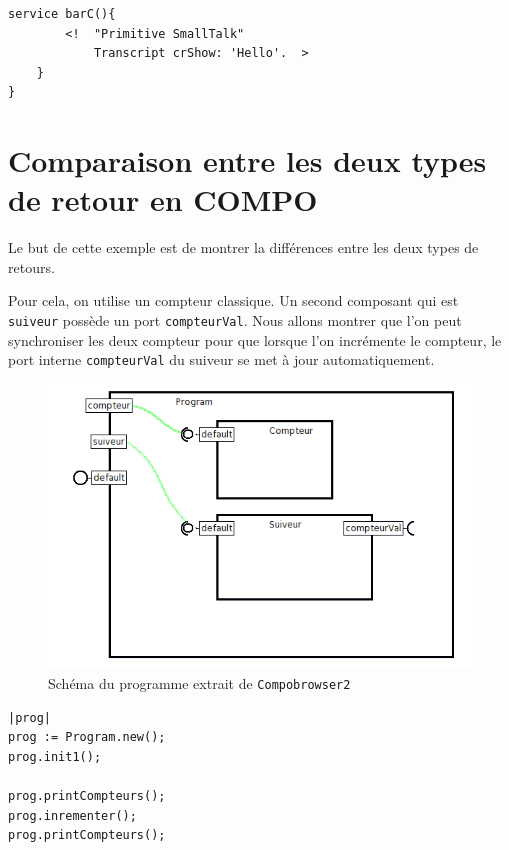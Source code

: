 \documentclass[11pt,a4paper,openany,oneside]{book}
\begin{document}
\begin{appendices}
\begin{lstlisting}[language=Compo, frame=single, caption=Programme C]
	service barC(){
		<!	"Primitive SmallTalk"
		    Transcript crShow: 'Hello'.	 > 
	}
}
\end{lstlisting}




\chapter{Comparaison entre les deux types de retour en COMPO}
\label{annexeretourcomparaison}

Le but de cette exemple est de montrer la différences entre les deux types de retours.

Pour cela, on utilise un compteur classique. Un second composant qui est \texttt{suiveur} possède un port \texttt{compteurVal}. Nous allons montrer que l'on peut synchroniser les deux compteur pour que lorsque l'on incrémente le compteur, le port interne \texttt{compteurVal} du suiveur se met à jour automatiquement.

\begin{figure}[H]
\centering
\includegraphics[scale=0.7, keepaspectratio=true]{CompteurSuiveur}
\caption{Schéma du programme extrait de \texttt{Compobrowser2}}
\label{compteursuiveur}
\end{figure}

\clearpage

\begin{lstlisting}[language=Compo, frame=single, caption=Workspace (Retour classique)]
|prog|
prog := Program.new();
prog.init1();

prog.printCompteurs();
prog.inrementer();
prog.printCompteurs();
\end{lstlisting}



\end{appendices}
\end{document}
